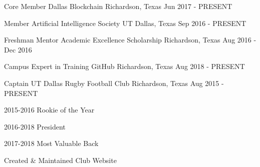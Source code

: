 

\begin{cventries}

	\cventry
	{Core Member} %
	{Dallas Blockchain} %
	{Richardson, Texas} %
	{Jun 2017 - PRESENT} %
	{
		\begin{cvitems} %
		\end{cvitems}
	}

	\cventry
	{Member} %
	{Artificial Intelligence Society} %
	{UT Dallas, Texas} %
	{Sep 2016 - PRESENT} %
	{
		\begin{cvitems} %
		\end{cvitems}
	}

	\cventry
	{Freshman Mentor} %
	{Academic Excellence Scholarship} %
	{Richardson, Texas} %
	{Aug 2016 - Dec 2016} %
	{
		\begin{cvitems} %
		\end{cvitems}
	}

	\cventry
	{Campus Expert in Training} %
	{GitHub} %
	{Richardson, Texas} %
	{Aug 2018 - PRESENT} %
	{
		\begin{cvitems} %
		\end{cvitems}
	}

	\cventry
	{Captain} %
	{UT Dallas Rugby Football Club} %
	{Richardson, Texas} %
	{Aug 2015 - PRESENT} %
	{
		\begin{cvitems} %
			\item {2015-2016 Rookie of the Year}
			\item {2016-2018 President}
			\item {2017-2018 Most Valuable Back}
			\item {Created \& Maintained Club Website}
		\end{cvitems}
	}

\end{cventries}

